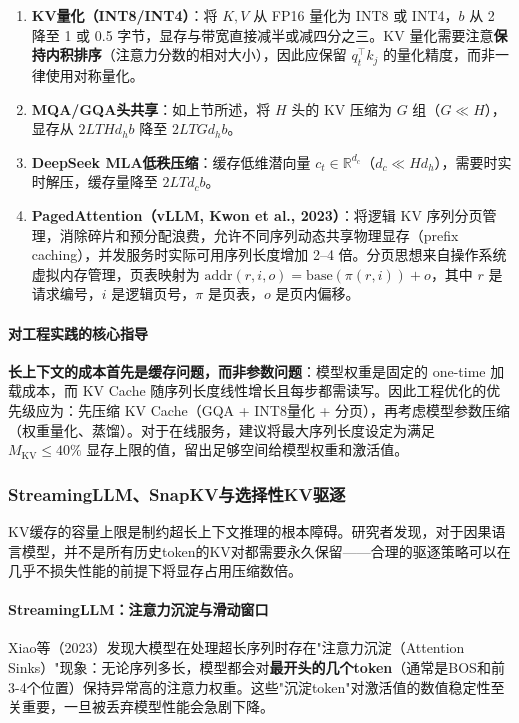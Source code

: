 \documentclass[12pt,a4paper]{article}
\begin{document}
\begin{enumerate}
    \item \textbf{KV量化（INT8/INT4）}：将 $K, V$ 从 FP16 量化为 INT8 或 INT4，$b$ 从 2 降至 1 或 0.5 字节，显存与带宽直接减半或减四分之三。KV 量化需要注意\textbf{保持内积排序}（注意力分数的相对大小），因此应保留 $q_t^\top k_j$ 的量化精度，而非一律使用对称量化。
    \item \textbf{MQA/GQA头共享}：如上节所述，将 $H$ 头的 KV 压缩为 $G$ 组（$G \ll H$），显存从 $2LTHd_h b$ 降至 $2LTGd_h b$。
    \item \textbf{DeepSeek MLA低秩压缩}：缓存低维潜向量 $c_t \in \mathbb{R}^{d_c}$（$d_c \ll H d_h$），需要时实时解压，缓存量降至 $2LTd_c b$。
    \item \textbf{PagedAttention（vLLM, Kwon et al., 2023）}：将逻辑 KV 序列分页管理，消除碎片和预分配浪费，允许不同序列动态共享物理显存（prefix caching），并发服务时实际可用序列长度增加 2--4 倍。分页思想来自操作系统虚拟内存管理，页表映射为 $\text{addr}(r, i, o) = \text{base}(\pi(r,i)) + o$，其中 $r$ 是请求编号，$i$ 是逻辑页号，$\pi$ 是页表，$o$ 是页内偏移。
\end{enumerate}

\paragraph{对工程实践的核心指导}

\textbf{长上下文的成本首先是缓存问题，而非参数问题}：模型权重是固定的 one-time 加载成本，而 KV Cache 随序列长度线性增长且每步都需读写。因此工程优化的优先级应为：先压缩 KV Cache（GQA + INT8量化 + 分页），再考虑模型参数压缩（权重量化、蒸馏）。对于在线服务，建议将最大序列长度设定为满足 $M_{\text{KV}} \le 40\%$ 显存上限的值，留出足够空间给模型权重和激活值。

\subsubsection{StreamingLLM、SnapKV与选择性KV驱逐}

KV缓存的容量上限是制约超长上下文推理的根本障碍。研究者发现，对于因果语言模型，并不是所有历史token的KV对都需要永久保留——合理的驱逐策略可以在几乎不损失性能的前提下将显存占用压缩数倍。

\paragraph{StreamingLLM：注意力沉淀与滑动窗口}

Xiao等（2023）发现大模型在处理超长序列时存在"注意力沉淀（Attention Sinks）"现象：无论序列多长，模型都会对\textbf{最开头的几个token}（通常是BOS和前3-4个位置）保持异常高的注意力权重。这些"沉淀token"对激活值的数值稳定性至关重要，一旦被丢弃模型性能会急剧下降。
\end{document}
